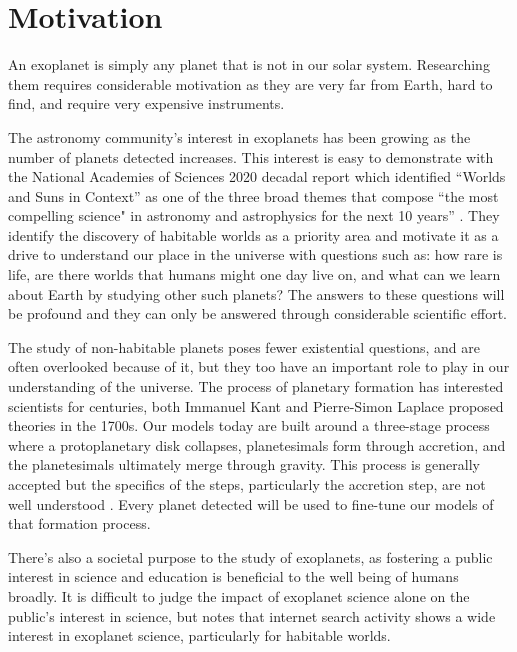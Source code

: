 \section{Motivation}
\label{sec:motivation}

An exoplanet is simply any planet that is not in our solar system. Researching
them requires considerable motivation as they are very far from Earth,
hard to find, and require very expensive instruments. 

The astronomy community's interest in exoplanets has been growing as the number
of planets detected increases. This interest is easy to demonstrate with the
National Academies of Sciences 2020 decadal report which identified ``Worlds and
Suns in Context'' as one of the three broad themes that compose ``the most
compelling science" in astronomy and astrophysics for the next 10 years'' 
\citep{nationalacademiesofsciencesPathwaysDiscoveryAstronomy2021}. They
identify the discovery of habitable worlds as a priority area and motivate it
as a drive to understand our place in the universe with questions such as: how
rare is life, are there worlds that humans might one day live on, and what can we
learn about Earth by studying other such planets? The answers to these questions
will be profound and they can only be answered through considerable scientific
effort.

The study of non-habitable planets poses fewer existential questions, and are
often overlooked because of it, but they too have an important role to play in
our understanding of the universe. The process of planetary formation has
interested scientists for centuries, both Immanuel Kant and Pierre-Simon
Laplace proposed theories \citep{Perryman2018a} in the 1700s. Our models today
are built around a three-stage process where a protoplanetary disk collapses,
planetesimals form through accretion, and the planetesimals ultimately merge
through gravity\citep{Jeffery}. This process is generally accepted but the
specifics of the steps, particularly the accretion step, are not well
understood \citep{Perryman2018a}. Every planet detected will be used to
fine-tune our models of that formation process.

There's also a societal purpose to the study of exoplanets, as fostering a
public interest in science and education is beneficial to the well being of
humans broadly. It is difficult to judge the impact of exoplanet science alone
on the public's interest in science, but \citet{deegImpactExoplanet2018} notes
that internet search activity shows a wide interest in exoplanet science,
particularly for habitable worlds.


